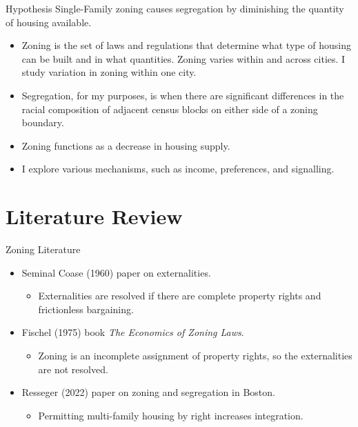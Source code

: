 \documentclass{beamer}
\begin{document}
\begin{frame}{Hypothesis}
    Single-Family zoning causes segregation by diminishing the quantity of housing available.
    \begin{itemize}
        \item Zoning is the set of laws and regulations that determine what type of housing can be built and in what quantities. Zoning varies within and across cities. I study variation in zoning within one city.
        \item Segregation, for my purposes, is when there are significant differences in the racial composition of adjacent census blocks on either side of a zoning boundary.
        \item Zoning functions as a decrease in housing supply.
        \item I explore various mechanisms, such as income, preferences, and signalling.
    \end{itemize} 
\end{frame}

\section{Literature Review}

\begin{frame}{Zoning Literature}
    \begin{itemize}
        \item Seminal Coase (1960) paper on externalities.
        \begin{itemize}
            \item Externalities are resolved if there are complete property rights and frictionless bargaining.
        \end{itemize}
        \item Fischel (1975) book \textit{The Economics of Zoning Laws}.
        \begin{itemize}
            \item Zoning is an incomplete assignment of property rights, so the externalities are not resolved.
        \end{itemize}
        \item Resseger (2022) paper on zoning and segregation in Boston.
        \begin{itemize}
            \item Permitting multi-family housing by right increases integration.
        \end{itemize}
    \end{itemize}
\end{frame}
\end{document}
